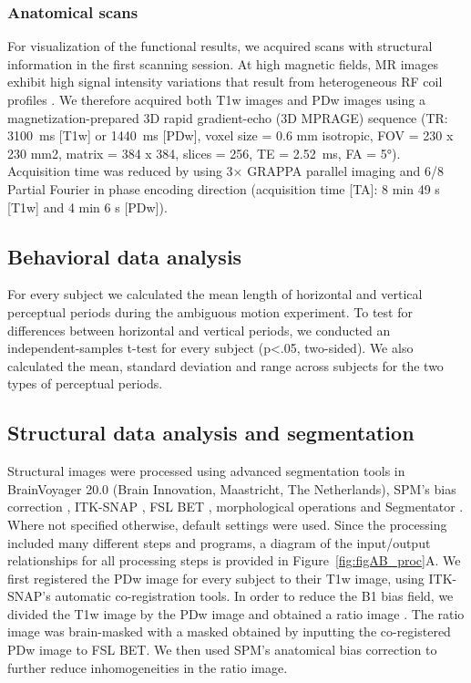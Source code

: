 \subsubsection{Anatomical scans}
For visualization of the functional results, we acquired scans with structural information in the first scanning session. At high magnetic fields, MR images exhibit high signal intensity variations that result from heterogeneous RF coil profiles \parencite{Moortele2009}. We therefore acquired both T1w images and PDw images using a magnetization-prepared 3D rapid gradient-echo (3D MPRAGE) sequence (TR: 3100~ms [T1w] or 1440~ms [PDw], voxel size = 0.6 mm isotropic, FOV = 230 x 230 mm2, matrix = 384 x 384, slices = 256, TE = 2.52~ms, FA = 5°). Acquisition time was reduced by using 3× GRAPPA parallel imaging and 6/8 Partial Fourier in phase encoding direction (acquisition time [TA]: 8 min 49 s [T1w] and 4 min 6 s [PDw]).

\subsection{Behavioral data analysis}
For every subject we calculated the mean length of horizontal and vertical perceptual periods during the ambiguous motion experiment. To test for differences between horizontal and vertical periods, we conducted an independent-samples t-test for every subject (p\textless.05, two-sided). We also calculated the mean, standard deviation and range across subjects for the two types of perceptual periods.

\subsection{Structural data analysis and segmentation}
Structural images were processed using advanced segmentation tools in BrainVoyager 20.0 (Brain Innovation, Maastricht, The Netherlands), SPM's bias correction \parencite{Ashburner2005}, ITK-SNAP \parencite{py06nimg}, FSL BET \parencite{Smith2002}, morphological operations \parencite{scipy2001} and Segmentator \parencite{Gulban2018a}. Where not specified otherwise, default settings were used. Since the processing included many different steps and programs, a diagram of the input/output relationships for all processing steps is provided in Figure~\ref{fig:figAB_proc}A. We first registered the PDw image for every subject to their T1w image, using ITK-SNAP's automatic co-registration tools. In order to reduce the B1 bias field, we divided the T1w image by the PDw image and obtained a ratio image \parencite{Moortele2009}. The ratio image was brain-masked with a masked obtained by inputting the co-registered PDw image to FSL BET. We then used SPM's anatomical bias correction to further reduce inhomogeneities in the ratio image.

